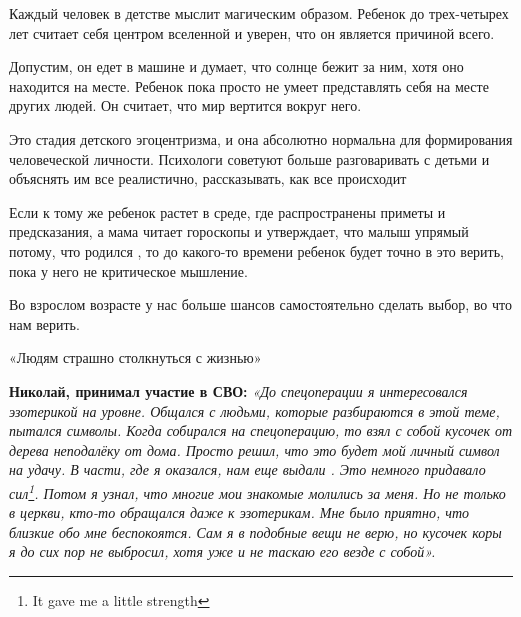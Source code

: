 Каждый человек в детстве мыслит магическим образом. Ребенок до трех-четырех лет считает себя центром вселенной и уверен, что он является причиной всего.

Допустим, он едет в машине и думает, что солнце бежит за ним, хотя оно находится на месте. Ребенок пока просто не умеет представлять себя на месте других людей. Он считает, что мир вертится вокруг него.

\begin{fancyquotes}
    Это стадия детского эгоцентризма, и она абсолютно нормальна для формирования человеческой личности. Психологи советуют больше разговаривать с детьми и объяснять им все реалистично, рассказывать, как все происходит
\end{fancyquotes}

Если к тому же ребенок растет в среде, где распространены приметы и предсказания, а мама читает гороскопы и
утверждает, что малыш упрямый потому, что родился , то до
какого-то времени ребенок будет точно в это верить, пока у него не
 критическое мышление.

Во взрослом возрасте у нас больше шансов самостоятельно сделать выбор, во что нам верить.

\vspace*{1em}
\begin{center}
    \Large «Людям страшно столкнуться с жизнью»
\end{center}
\vspace*{1em}

\textbf{Николай, принимал участие в СВО: } \textit{«До спецоперации я интересовался эзотерикой на  уровне. Общался с людьми, которые разбираются в этой теме, пытался  символы. Когда собирался на спецоперацию, то взял с собой кусочек  от дерева неподалёку от дома. Просто решил, что это будет мой личный символ на удачу.
В части, где я оказался, нам еще выдали . Это немного придавало сил\footnote{It gave me a little strength}. Потом я узнал, что многие мои знакомые молились за меня. Но не только в церкви, кто-то обращался даже к эзотерикам. Мне было приятно, что близкие обо мне беспокоятся. Сам я в подобные вещи не верю, но кусочек коры я до сих пор не выбросил, хотя уже и не таскаю его везде с собой».}

